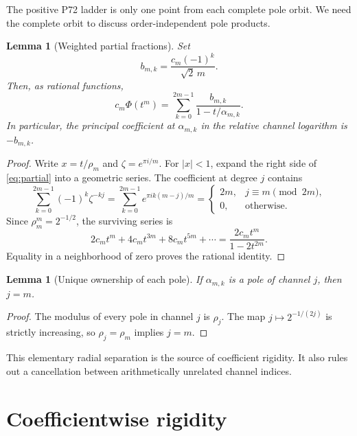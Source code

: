 \documentclass[11pt]{article}
\newtheorem{lemma}[theorem]{Lemma}
\begin{document}
The positive P72 ladder is only one point from each complete pole orbit.  We
need the complete orbit to discuss order-independent pole products.

\begin{lemma}[Weighted partial fractions]\label{lem:partial}
Set
\begin{equation}\label{eq:bmk}
 b_{m,k}=\frac{c_m(-1)^k}{\sqrt2\,m}.
\end{equation}
Then, as rational functions,
\begin{equation}\label{eq:partial}
 c_m\Phi(t^m)=\sum_{k=0}^{2m-1}
 \frac{b_{m,k}}{1-t/\alpha_{m,k}}.
\end{equation}
In particular, the principal coefficient at \(\alpha_{m,k}\) in the
relative channel logarithm is \(-b_{m,k}\).
\end{lemma}

\begin{proof}
Write \(x=t/\rho_m\) and \(\zeta=e^{\pi i/m}\).  For \(|x|<1\), expand
the right side of \cref{eq:partial} into a geometric series.  The coefficient
at degree \(j\) contains
\begin{equation}\label{eq:filter}
 \sum_{k=0}^{2m-1}(-1)^k\zeta^{-kj}
 =\sum_{k=0}^{2m-1}e^{\pi i k(m-j)/m}
 =\begin{cases}
 2m,&j\equiv m\pmod{2m},\\
 0,&\text{otherwise}.
 \end{cases}
\end{equation}
Since \(\rho_m^m=2^{-1/2}\), the surviving series is
\[
 2c_mt^m+4c_mt^{3m}+8c_mt^{5m}+\cdots
 =\frac{2c_mt^m}{1-2t^{2m}}.
\]
Equality in a neighborhood of zero proves the rational identity.
\end{proof}

\begin{lemma}[Unique ownership of each pole]\label{lem:ownership}
If \(\alpha_{m,k}\) is a pole of channel \(j\), then \(j=m\).
\end{lemma}

\begin{proof}
The modulus of every pole in channel \(j\) is \(\rho_j\).  The map
\(j\mapsto2^{-1/(2j)}\) is strictly increasing, so
\(\rho_j=\rho_m\) implies \(j=m\).
\end{proof}

This elementary radial separation is the source of coefficient rigidity.
It also rules out a cancellation between arithmetically unrelated channel
indices.

\section{Coefficientwise rigidity}
\end{document}
